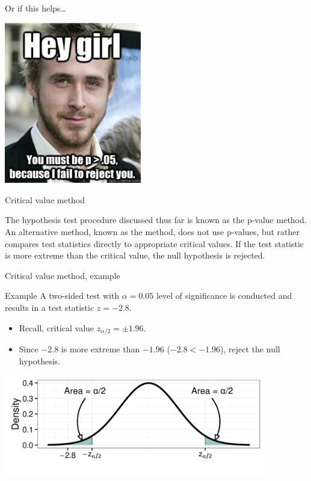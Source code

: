 \documentclass[xcolor=table, aspectratio=169, bigger]{beamer}
\begin{document}
\begin{frame}{Or if this helps\ldots}

{\centering
\includegraphics[width=2.35in]{../images/ch08_p_value_meme}
\par}

\end{frame}

\begin{frame}{Critical value method}
\begin{block}{}
The hypothesis test procedure discussed thus far is known as the p-value method. An alternative method, known as the  method, does not use p-values, but rather compares test statistics directly to appropriate critical values. If the test statistic is more extreme than the critical value, the null hypothesis is rejected.
\end{block}
\end{frame}

\begin{frame}{Critical value method, example}
\begin{exampleblock}{Example}
A two-sided test with $\alpha = 0.05$ level of significance is conducted and results in a test statistic $z= - 2.8$.
\begin{itemize}
\item Recall, critical value $z_{\alpha/2} = \pm 1.96$.
\item Since $-2.8$ is more extreme than $-1.96$ ($-2.8 < -1.96$), reject the null hypothesis.
\end{itemize} 
\end{exampleblock}

\medskip
{\centering
\includegraphics[width=4.5in]{../images/ch08_cv}
\par}

\end{frame}
\end{document}
